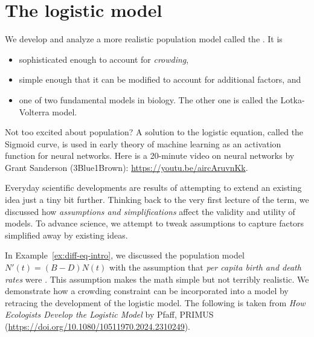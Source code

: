 \documentclass[../main.tex]{subfiles}
\begin{document}
 \section{The logistic model}

We develop and analyze a more realistic population model called the .  It is
\begin{itemize}
  \item sophisticated enough to account for \emph{crowding}, 
  \item simple enough that it can be modified to account for additional factors, and
  \item one of two fundamental models in biology. The other one is called the Lotka-Volterra model.
\end{itemize}

{\footnotesize \faYoutube{} Not too excited about population? A solution to the logistic equation, called the Sigmoid curve, is used in early theory of machine learning as an activation function for neural networks. Here is a 20-minute video on neural networks  by Grant Sanderson (3Blue1Brown): \url{https://youtu.be/aircAruvnKk}.}

Everyday scientific developments are results of attempting to extend an existing idea just a tiny bit further.  Thinking back to the very first lecture of the term, we discussed how \emph{assumptions and simplifications} affect the validity and utility of models.  To advance science, we attempt to tweak assumptions to capture factors simplified away by existing ideas. 

In Example~\ref{ex:diff-eq-intro}, we discussed the population model \(N'(t) = (B - D) N(t)\) with the assumption that \emph{per capita birth and death rates} were \underline{\hspace{2in}}.  This assumption makes the math simple but not terribly realistic.  We demonstrate how a crowding constraint can be incorporated into a model by retracing the development of the logistic model.  The following is taken from \emph{How Ecologists Develop the Logistic Model} by Pfaff, PRIMUS (\url{https://doi.org/10.1080/10511970.2024.2310249}).

\blanks*
\clearpage
\end{document}
